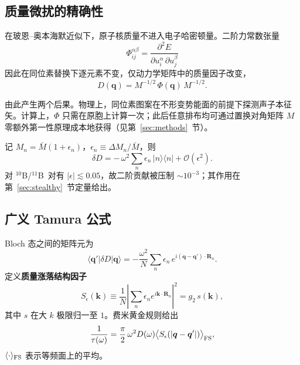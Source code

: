 \documentclass[10pt,twocolumn]{article}
\newcommand{\tenB}{$^{10}$B}
\newcommand{\elevenB}{$^{11}$B}
\begin{document}
\subsection{质量微扰的精确性}

在玻恩--奥本海默近似下，原子核质量不进入电子哈密顿量。二阶力常数张量
\begin{equation}
  \Phi_{ij}^{\alpha\beta}
    = \frac{\partial^{2}E}{\partial u_i^\alpha\,\partial u_j^\beta}
  \label{eq:phi}
\end{equation}
因此在同位素替换下逐元素不变，仅动力学矩阵中的质量因子改变，
\begin{equation}
  D(\bm q)=M^{-1/2}\,\Phi(\bm q)\,M^{-1/2}.
  \label{eq:dynmat}
\end{equation}

由此产生两个后果。物理上，同位素图案在不形变势能面的前提下探测声子本征矢。计算上，$\Phi$ 只需在原胞上计算一次；此后任意排布均可通过置换对角矩阵 $M$ 零额外第一性原理成本地获得（见第~\ref{sec:methods}~节）。

记 $M_n=\bar M(1+\epsilon_n)$，$\epsilon_n\equiv\Delta M_n/\bar M$，则
\begin{equation}
  \delta D = -\,\omega^{2}\sum_n \epsilon_n\,|n\rangle\langle n|
             + \mathcal{O}(\epsilon^{2}).
  \label{eq:deltaD}
\end{equation}
对 \tenB/\elevenB\ 对有 $|\epsilon|\lesssim0.05$，故二阶贡献被压制 $\sim10^{-3}$；其作用在第~\ref{sec:stealthy}~节定量给出。

\subsection{广义 Tamura 公式}

Bloch 态之间的矩阵元为
\begin{equation}
  \langle\bm q'|\delta D|\bm q\rangle
    = -\frac{\omega^{2}}{N}\sum_n \epsilon_n\,
      e^{i(\bm q-\bm q')\cdot\bm R_n}.
  \label{eq:matelem}
\end{equation}
定义\textbf{质量涨落结构因子}
\begin{equation}
  S_\epsilon(\bm k)\equiv
    \frac{1}{N}\left|\sum_n \epsilon_n e^{i\bm k\cdot\bm R_n}\right|^{2}
    = g_2\,s(\bm k),
  \label{eq:Seps}
\end{equation}
其中 $s$ 在大 $k$ 极限归一至 $1$。费米黄金规则给出
\begin{equation}
  \frac{1}{\tau(\omega)}
    = \frac{\pi}{2}\,\omega^{2}D(\omega)
      \big\langle S_\epsilon(|\bm q-\bm q'|)\big\rangle_{\rm FS},
  \label{eq:tamura}
\end{equation}
$\langle\cdot\rangle_{\rm FS}$ 表示等频面上的平均。
\end{document}

